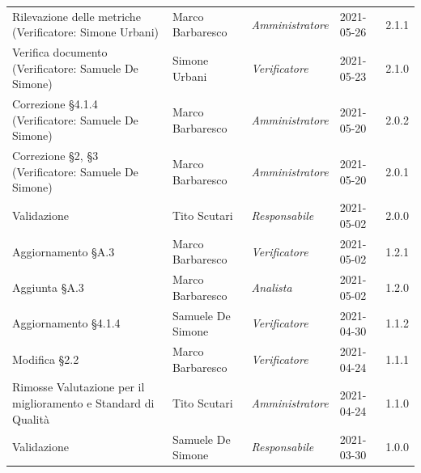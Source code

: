 \documentclass[a4paper]{article}
\begin{document}
\begin{center}
\begin{longtable}[!h]{p{160px} p{80px} p{70px} p{55px} p{40px}}
        Rilevazione delle metriche \newline (Verificatore: Simone Urbani)                         & Marco Barbaresco  & \textit{Amministratore} & 2021-05-26    & 2.1.1             \\
        Verifica documento \newline (Verificatore: Samuele De Simone)                             & Simone Urbani     & \textit{Verificatore}   & 2021-05-23    & 2.1.0             \\
        Correzione \S 4.1.4 \newline (Verificatore: Samuele De Simone)                            & Marco Barbaresco  & \textit{Amministratore} & 2021-05-20    & 2.0.2             \\
        Correzione \S2, \S3 \newline (Verificatore: Samuele De Simone)                            & Marco Barbaresco  & \textit{Amministratore} & 2021-05-20    & 2.0.1             \\
        Validazione                                                                               & Tito Scutari      & \textit{Responsabile}   & 2021-05-02    & 2.0.0             \\
        Aggiornamento \S A.3                                                                      & Marco Barbaresco  & \textit{Verificatore}   & 2021-05-02    & 1.2.1             \\
        Aggiunta \S A.3                                                                           & Marco Barbaresco  & \textit{Analista}       & 2021-05-02    & 1.2.0             \\
        Aggiornamento \S 4.1.4                                                                    & Samuele De Simone & \textit{Verificatore}   & 2021-04-30    & 1.1.2             \\
        Modifica \S 2.2                                                                           & Marco Barbaresco  & \textit{Verificatore}   & 2021-04-24    & 1.1.1             \\
        Rimosse Valutazione per il miglioramento e Standard di Qualità                            & Tito Scutari      & \textit{Amministratore} & 2021-04-24    & 1.1.0             \\
        Validazione                                                                               & Samuele De Simone & \textit{Responsabile}   & 2021-03-30    & 1.0.0             \\

\end{longtable}
\end{center}
\end{document}
